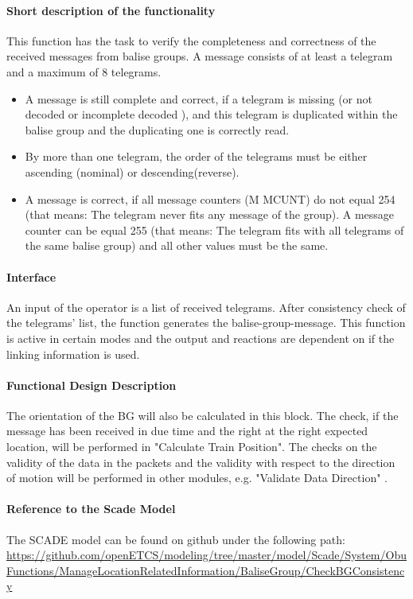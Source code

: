 \paragraph{Short description of the functionality}
This function has the task  to verify the completeness and correctness of the received messages from balise groups. A message consists of at least a telegram and a maximum of 8 telegrams.

\begin{itemize}
\item A message is still complete and correct, if a telegram is missing (or not decoded or incomplete decoded ), and this telegram is duplicated within the balise group and the duplicating one is correctly read.
\item By more than one telegram, the order of the telegrams must be either ascending (nominal) or descending(reverse).
\item A message is correct, if  all message counters (M MCUNT) do not equal 254 (that means: The telegram never fits any message of the group). A message counter can be equal 255 (that means: The telegram fits with all telegrams of the same balise group) and all other values must be the same.
\end{itemize}

\paragraph{Interface}
An input of the operator is a list of received telegrams. After consistency check of the telegrams' list, the function generates the balise-group-message. This function is active in certain modes and the output and reactions are dependent on if the linking information is used.

\paragraph{Functional Design Description}
The orientation of the BG will also be calculated in this block. The check, if the message has been received in due time and the right at the right expected location, will be performed in "Calculate Train Position". The checks on the validity of the data in the packets and the validity with respect to the direction of motion will be performed in other modules, e.g. "Validate Data Direction" .

\paragraph{Reference to the Scade Model}
The SCADE model can be found on github under the following path: \url{https://github.com/openETCS/modeling/tree/master/model/Scade/System/ObuFunctions/ManageLocationRelatedInformation/BaliseGroup/CheckBGConsistency}


